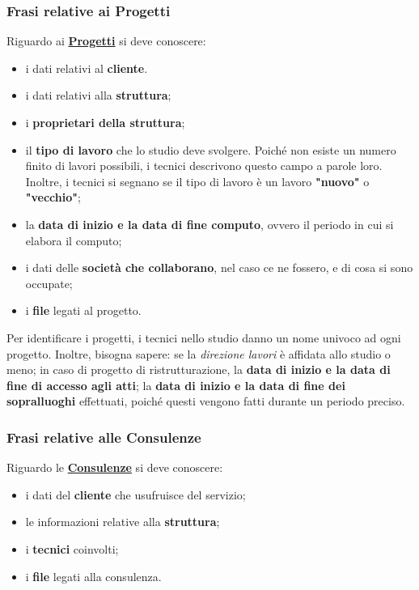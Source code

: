 \documentclass{elegantbook}
\begin{document}
	\subsubsection{Frasi relative ai Progetti}
	
	Riguardo ai \underline{\textbf{Progetti}} si deve conoscere:
	\begin{itemize}
		\item i dati relativi al \textbf{cliente}.
		\item i dati relativi alla \textbf{struttura};
		\item i \textbf{proprietari della struttura}; 
		\item il \textbf{tipo di lavoro} che lo studio deve svolgere. Poiché non esiste un numero finito di lavori possibili, i tecnici descrivono questo campo a parole loro. Inoltre, i tecnici si segnano se il tipo di lavoro è un lavoro \textbf{"nuovo"} o \textbf{"vecchio"};
		\item la \textbf{data di inizio e la data di fine computo}, ovvero il periodo in cui si elabora il computo;
		\item i dati delle \textbf{società che collaborano}, nel caso ce ne fossero, e di cosa si sono occupate;
		\item i \textbf{file} legati al progetto.
	\end{itemize}
	
	Per identificare i progetti, i tecnici nello studio danno un nome univoco ad ogni progetto. Inoltre, bisogna sapere: se la \textit{direzione lavori} è affidata allo studio o meno; in caso di progetto di ristrutturazione, la \textbf{data di inizio e la data di fine di accesso agli atti}; la \textbf{data di inizio e la data di fine dei sopralluoghi} effettuati, poiché questi vengono fatti durante un periodo preciso.
	
	\subsubsection{Frasi relative alle Consulenze}
	
	Riguardo le \underline{\textbf{Consulenze}} si deve conoscere:
	\begin{itemize}
		\item i dati del \textbf{cliente} che usufruisce del servizio;
		\item le informazioni relative alla \textbf{struttura};
		\item i \textbf{tecnici} coinvolti;
		\item i \textbf{file} legati alla consulenza.
	\end{itemize}
	
\end{document}
